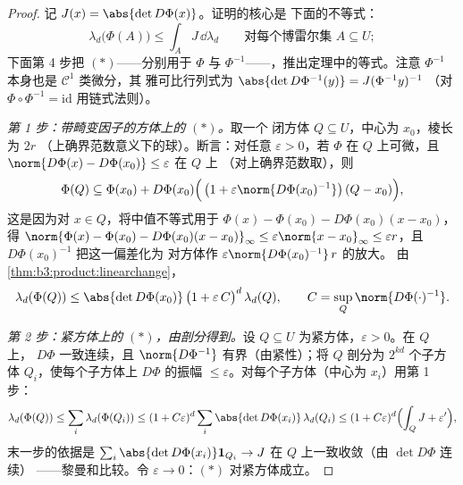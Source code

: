 \begin{proof}
记 $J(x) = \abs{\det D\Phi(x)}$。证明的核心是
下面的不等式：
\[
\lambda_d\bigl(\Phi(A)\bigr) \leq \int_A J\,\dd\lambda_d
\qquad\text{对每个博雷尔集 } A \subseteq U;
\tag{$*$}
\]
下面第 4 步把 $(*)$——分别用于 $\Phi$ 与
$\Phi^{-1}$——，推出定理中的等式。注意
$\Phi^{-1}$ 本身也是 $\mathcal C^1$ 类微分，其
雅可比行列式为 $\abs{\det D\Phi^{-1}(y)} = J(\Phi^{-1}y)^{-1}$
（对 $\Phi\circ\Phi^{-1} = \mathrm{id}$ 用链式法则）。

\emph{第 1 步：带畸变因子的方体上的 $(*)$。}取一个
闭方体 $Q \subseteq U$，中心为 $x_0$，棱长为 $2r$
（上确界范数意义下的球）。断言：对任意 $\varepsilon > 0$，若 $\Phi$
在 $Q$ 上可微，且
$\norm{D\Phi(x) - D\Phi(x_0)} \leq \varepsilon$ 在 $Q$ 上
（对上确界范数取），则
\[
\Phi(Q) \subseteq \Phi(x_0) + D\Phi(x_0)\Bigl(\,\bigl(1 +
\varepsilon\norm{D\Phi(x_0)^{-1}}\bigr)\,(Q - x_0)\Bigr),
\]
这是因为对 $x \in Q$，将中值不等式用于
$\Phi(x) - \Phi(x_0) - D\Phi(x_0)(x - x_0)$，得
$\norm{\Phi(x) - \Phi(x_0) - D\Phi(x_0)(x-x_0)}_\infty \leq
\varepsilon\norm{x - x_0}_\infty \leq \varepsilon r$，且
$D\Phi(x_0)^{-1}$ 把这一偏差化为
对方体作 $\varepsilon\norm{D\Phi(x_0)^{-1}}\,r$ 的放大。
由\cref{thm:b3:product:linearchange}，
\[
\lambda_d(\Phi(Q)) \leq \abs{\det D\Phi(x_0)}\,
\bigl(1 + \varepsilon\,C\bigr)^{d}\,\lambda_d(Q),
\qquad C = \sup_{Q}\norm{D\Phi(\cdot)^{-1}} .
\]

\emph{第 2 步：紧方体上的 $(*)$，由剖分得到。}设 $Q
\subseteq U$ 为紧方体，$\varepsilon > 0$。在 $Q$ 上，
$D\Phi$ 一致连续，且 $\norm{D\Phi^{-1}}$
有界（由紧性）；将 $Q$ 剖分为 $2^{kd}$ 个子方体
$Q_i$，使每个子方体上 $D\Phi$ 的振幅
$\leq \varepsilon$。对每个子方体（中心为 $x_i$）用第 1 步：
\[
\lambda_d(\Phi(Q)) \leq \sum_i\lambda_d(\Phi(Q_i))
\leq (1 + C\varepsilon)^d \sum_i \abs{\det
D\Phi(x_i)}\,\lambda_d(Q_i)
\leq (1 + C\varepsilon)^d\Bigl(\int_Q J + \varepsilon'\Bigr),
\]
末一步的依据是 $\sum_i\abs{\det D\Phi(x_i)}\mathbf
1_{Q_i} \to J$ 在 $Q$ 上一致收敛（由 $\det D\Phi$ 连续）
——黎曼和比较。令 $\varepsilon \to 0$：$(*)$
对紧方体成立。


\end{proof}
